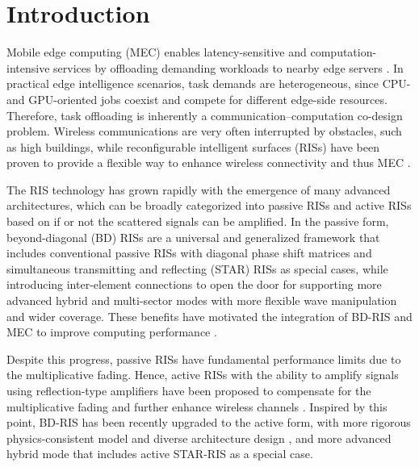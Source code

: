 \documentclass[conference]{IEEEtran}
\begin{document}
\section{Introduction}

Mobile edge computing (MEC) enables latency-sensitive and computation-intensive services by offloading demanding workloads to nearby edge servers \cite{Mao2017Survey}. In practical edge intelligence scenarios, task demands are heterogeneous, since CPU- and GPU-oriented jobs coexist and compete for different edge-side resources. Therefore, task offloading is inherently a communication--computation co-design problem. 
Wireless communications are very often interrupted by obstacles, such as high buildings, while reconfigurable intelligent surfaces (RISs) \cite{liu2021reconfigurable} have been proven to provide a flexible way to enhance wireless connectivity and thus MEC \cite{Hu2021RISMECOptimizationLearning}.

The RIS technology has grown rapidly with the emergence of many advanced architectures, which can be broadly categorized into passive RISs and active RISs based on if or not the scattered signals can be amplified.
In the passive form, beyond-diagonal (BD) RISs \cite{Li2026Tutorial} are a universal and generalized framework that includes conventional passive RISs with diagonal phase shift matrices \cite{liu2021reconfigurable} and simultaneous transmitting and reflecting (STAR) RISs \cite{Liu2021STAR360Coverage} as special cases, while introducing inter-element connections to open the door for supporting more advanced hybrid and multi-sector modes with more flexible wave manipulation and wider coverage. 
These benefits have motivated the integration of BD-RIS and MEC to improve computing performance \cite{Qin2025Joint}. 

Despite this progress, passive RISs have fundamental performance limits due to the multiplicative fading. Hence, active RISs with the ability to amplify signals using reflection-type amplifiers have been proposed to compensate for the multiplicative fading and further enhance wireless channels \cite{Long2021ActiveRISAided,Xu2023Active}. Inspired by this point, BD-RIS has been recently upgraded to the active form, with more rigorous physics-consistent model and diverse architecture design \cite{shen2026active}, and more advanced hybrid mode \cite{liu2026active} that includes active STAR-RIS \cite{Xu2023Active} as a special case. 
\end{document}
